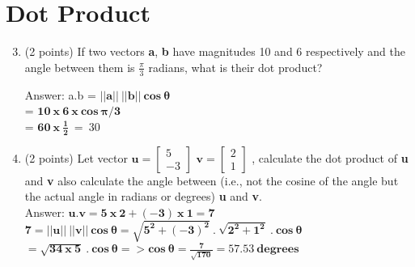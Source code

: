 \documentclass{article}%
\begin{document}
\section*{Dot Product}
\begin{enumerate}
  \setcounter{enumi}{2}
    \item (2 points) If two vectors \textbf{a}, \textbf{b} have magnitudes 10 and 6 respectively and the angle between them is $\frac{\pi}{3}$ radians, what is their dot product?
    

    Answer: a.b = $\mathbf{||a||\ ||b||\ cos\ \theta}$ \\
    = $\mathbf{10\ x \ 6\ x \ cos\ \pi / 3}$ \\
    = $\mathbf{60\ x\ \frac{1}{2}}\ = \ 30$

    
    \item (2 points) Let vector $\mathbf{u} = \begin{bmatrix} 5\\ -3 \end{bmatrix}$  $\mathbf{v} = \begin{bmatrix}2\\ 1\end{bmatrix}$ , calculate the dot product of \textbf{u} and \textbf{v} also calculate the angle between (i.e., not the cosine of the angle but the actual angle in radians or degrees) \textbf{u} and \textbf{v}. \\


    Answer: $\mathbf{u.v = 5\ x\ 2 + (-3)\ x\ 1 = 7}$ \\
    $\mathbf{7 = ||u||\ ||v||\ cos\ \theta = \sqrt{5^2 + (-3)^2}\ .\ \sqrt{2^2 + 1^2}\ .\ cos\ \theta}$ \\
    $\mathbf{ = \sqrt{34\ x\ 5}\ .\ cos\ \theta => cos\ \theta = \frac{7}{\sqrt{170}} = 57.53\ degrees}$

\end{enumerate}
\end{document}
